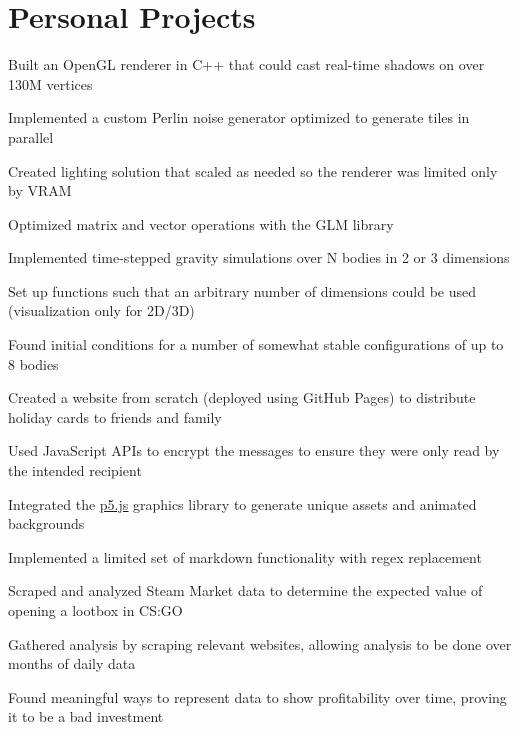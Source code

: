 \section{Personal Projects}

\begin{bullets}
    \item Built an OpenGL renderer in C++ that could cast real-time shadows on over 130M vertices
    \item Implemented a custom Perlin noise generator optimized to generate tiles in parallel
    \item Created lighting solution that scaled as needed so the renderer was limited only by VRAM
    \item Optimized matrix and vector operations with the GLM library
\end{bullets}

\begin{bullets}
    \item Implemented time-stepped gravity simulations over N bodies in 2 or 3 dimensions
    \item Set up functions such that an arbitrary number of dimensions could be used (visualization only for 2D/3D)
    \item Found initial conditions for a number of somewhat stable configurations of up to 8 bodies
\end{bullets}

\begin{bullets}
    \item Created a website from scratch (deployed using GitHub Pages) to distribute holiday cards to friends and family
    \item Used JavaScript APIs to encrypt the messages to ensure they were only read by the intended recipient
    \item Integrated the \href{https://p5js.org}{\underline{p5.js}} graphics library to generate unique assets and animated backgrounds
    \item Implemented a limited set of markdown functionality with regex replacement
\end{bullets}

\begin{bullets}
    \item Scraped and analyzed Steam Market data to determine the expected value of opening a lootbox in CS:GO
    \item Gathered analysis by scraping relevant websites, allowing analysis to be done over months of daily data
    \item Found meaningful ways to represent data to show profitability over time, proving it to be a bad investment
\end{bullets}
